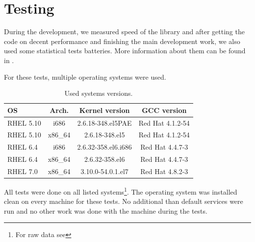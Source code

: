 \chapter{Testing} \label{chap:testing}
\par{
During the development, we measured speed of the library and after getting the code on decent performance and finishing the main development work, we also used some statistical tests batteries. More information about them can be found in .
}
\par{
For these tests, multiple operating systems were used.
\begin{table}[h!]
  \begin{center}
    \begin{tabular}{|l|c|c|c|}
      \hline
      OS & Arch. & Kernel version & GCC version\\
      \hline
      \hline
      RHEL 5.10 & i686 & 2.6.18-348.el5PAE & Red Hat 4.1.2-54\\
      \hline
      RHEL 5.10 & x86\_64 & 2.6.18-348.el5 & Red Hat 4.1.2-54\\
      \hline
      RHEL 6.4 & i686 & 2.6.32-358.el6.i686 & Red Hat 4.4.7-3\\
      \hline
      RHEL 6.4 & x86\_64 & 2.6.32-358.el6 & Red Hat 4.4.7-3\\
      \hline
      RHEL 7.0 & x86\_64 & 3.10.0-54.0.1.el7 & Red Hat 4.8.2-3\\
      \hline
    \end{tabular}
    \caption{Used systems versions.}
    \label{tab:testing:systems}
  \end{center}
\end{table}
}

\par{
All tests were done on all listed systems\footnote{For raw data see }. The operating system was installed clean on every machine for these tests. No additional than default services were run and no other work was done with the machine during the tests.
}



